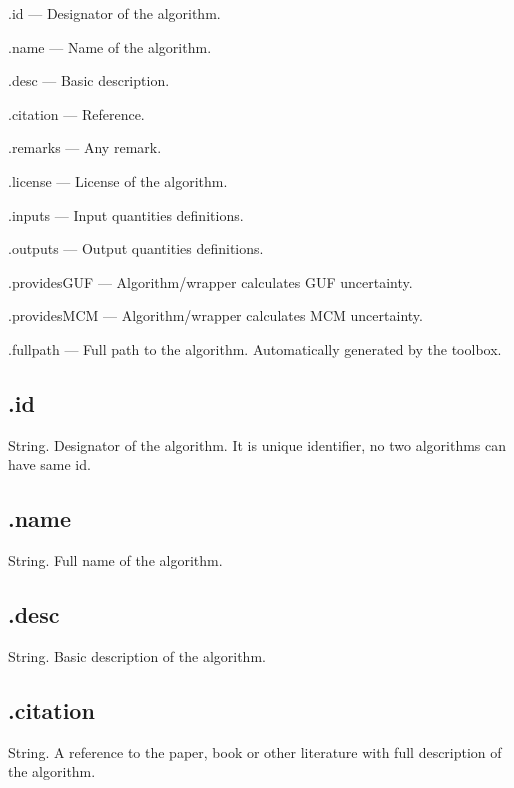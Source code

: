 \documentclass[12pt,a4paper,oneside]{report} %
\begin{document}
\begin{tightdesc}
        \item [\textsf{.id}] --- Designator of the algorithm.
        \item [\textsf{.name}] ---  Name of the algorithm.
        \item [\textsf{.desc}] ---  Basic description.
        \item [\textsf{.citation}] ---  Reference.
        \item [\textsf{.remarks}] ---  Any remark.
        \item [\textsf{.license}] ---  License of the algorithm.
        \item [\textsf{.inputs}] ---  Input quantities definitions.
        \item [\textsf{.outputs}] ---  Output quantities definitions.
        \item [\textsf{.providesGUF}] ---  Algorithm/wrapper calculates GUF uncertainty.
        \item [\textsf{.providesMCM}] ---  Algorithm/wrapper calculates MCM uncertainty.
        \item [\textsf{.fullpath}] ---  Full path to the algorithm. Automatically generated by the toolbox.
\end{tightdesc}

\subsection{\textsf{.id}} %
\label{structalginfoid}
String. Designator of the algorithm. It is unique identifier, no two algorithms can have same id.

\subsection{\textsf{.name}} %
\label{structalginfoname}
String. Full name of the algorithm. 

\subsection{\textsf{.desc}} %
\label{structalginfodesc}
String. Basic description of the algorithm.

\subsection{\textsf{.citation}} %
\label{structalginfocitation}
String. A reference to the paper, book or other literature with full description of the algorithm.
\end{document}
